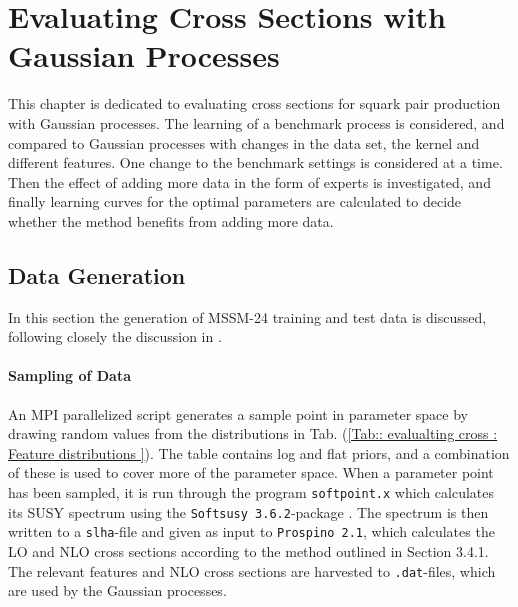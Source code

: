 \documentclass[twoside,english]{uiofysmaster}
\begin{document}
\tableofcontents



\chapter{Evaluating Cross Sections with Gaussian Processes}

This chapter is dedicated to evaluating cross sections for squark pair production with Gaussian processes. The learning of a benchmark process is considered, and compared to Gaussian processes with changes in the data set, the kernel and different features. One change to the benchmark settings is considered at a time. Then the effect of adding more data in the form of experts is investigated, and finally learning curves for the optimal parameters are calculated to decide whether the method benefits from adding more data.

\section{Data Generation}

In this section the generation of MSSM-24 training and test data is discussed, following closely the discussion in \cite{sparre2018fast}. 

\subsubsection{Sampling of Data}

An MPI parallelized script generates a sample point in parameter space by drawing random values from the distributions in Tab. (\ref{Tab:: evalualting cross : Feature distributions }). The table contains log and flat priors, and a combination of these is used to cover more of the parameter space. When a parameter point has been sampled, it is run through the program \verb|softpoint.x| which calculates its SUSY spectrum using the \verb|Softsusy 3.6.2|-package \cite{ALLANACH2002305}. The spectrum is then written to a \verb|slha|-file and given as input to \verb|Prospino 2.1|, which calculates the LO and NLO cross sections according to the method outlined in Section 3.4.1. The relevant features and NLO cross sections are harvested to \verb|.dat|-files, which are used by the Gaussian processes. 
\end{document}
